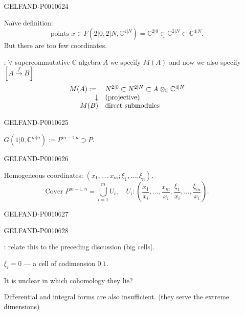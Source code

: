 \begin{GelfandAdjacentEvidence}{GELFAND-P001062}{4}


Naïve definition:
\[
\text{points }x\in F(2|0,2|N,\mathbb C^{4|N})
  =\underline{\mathbb C^{2|0}\subset\mathbb C^{2|N}}\subset\mathbb C^{4|N}.
\]
But there are too few coordinates.

: \(\forall\) supercommutative \(\mathbb C\)-algebra \(A\) we specify \(M(A)\)
and now we also specify \([A\overset f\longrightarrow B]\)
\[
\begin{array}{r@{\quad}l}
M(A):={}&N^{2|0}\subset N^{2|N}\subset A\otimes_{\mathbb C}\mathbb C^{4|N}\\
\downarrow&\text{(projective)}\\
M(B)&\text{direct submodules}
\end{array}
\]
\end{GelfandAdjacentEvidence}
\begin{GelfandAdjacentEvidence}{GELFAND-P001062}{5}


\quad
\(G(1|0,\mathbb C^{m|n}):=P^{m-1|n}\supset P\).
\end{GelfandAdjacentEvidence}
\begin{GelfandAdjacentEvidence}{GELFAND-P001062}{6}


Homogeneous coordinates: \((x_1,\ldots,x_m;\xi_1,\ldots,\xi_n)\).
\[
\text{Cover } P^{m-1,n}=\bigcup_{i=1}^{m}U_i,\quad
U_i:\left(\frac{x_1}{x_i},\ldots,\frac{x_m}{x_i},
          \frac{\xi_1}{x_i},\ldots,\frac{\xi_m}{x_i}\right).
\]
\end{GelfandAdjacentEvidence}
\begin{GelfandAdjacentEvidence}{GELFAND-P001062}{7}

\end{GelfandAdjacentEvidence}
\begin{GelfandAdjacentEvidence}{GELFAND-P001062}{8}


: relate this to the preceding discussion (big cells).

 \(\xi_i=0\) — a cell of codimension \(0|1\).

It is unclear in which cohomology they lie?

Differential and integral forms are also insufficient. (they serve the extreme dimensions)
\end{GelfandAdjacentEvidence}
